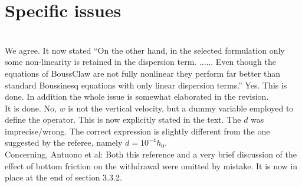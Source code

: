 \documentclass[11pt]{article}
\begin{document}
\section*{Specific issues}
\begin{enumerate}
\\
We agree. It now stated ``On the other hand, in the selected formulation only some non-linearity is retained in
the dispersion term. ......
Even though the equations of BoussClaw are not fully nonlinear they perform far better
than standard Boussinesq equations with only linear dispersion terms.''
Yes. This is done. In addition the whole issue is somewhat elaborated in the revision.
\\
It is  done.
No, $w$ is not the vertical velocity, but a dummy variable employed to define the operator.
This is now explicitly stated in the text.
The $d$ was imprecise/wrong. The correct expression is slightly different from the one suggested by
the referee, namely $d=10^{-4}h_0$.\\
Concerning, Antuono et al: Both this reference and a very brief discussion of the effect of bottom friction on 
the withdrawal were omitted by mistake. It is now in place at the end of section 3.3.2.


\end{enumerate}
\end{document}

